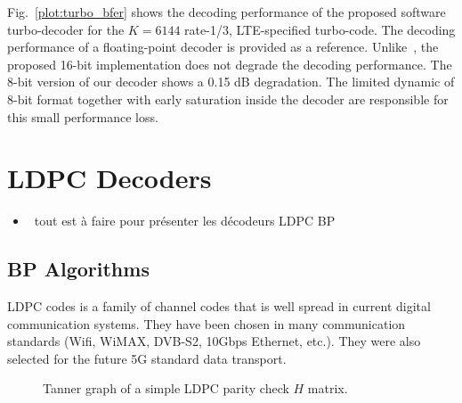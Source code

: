 Fig.~\ref{plot:turbo_bfer} shows the decoding performance of the proposed
software turbo-decoder for the $K = 6144$ rate-1/3, LTE-specified turbo-code.
The decoding performance of a floating-point decoder is provided as a reference.
Unlike~\cite{Wu2013}, the proposed 16-bit implementation does not degrade the
decoding performance. The 8-bit version of our decoder shows a 0.15 dB
degradation. The limited dynamic of 8-bit format together with early saturation
inside the decoder are responsible for this small performance loss.

\section{LDPC Decoders}

\begin{itemize}
  \item \xmark~tout est à faire pour présenter les décodeurs LDPC BP
\end{itemize}

\subsection{BP Algorithms}

LDPC codes is a family of channel codes that is well spread in current digital
communication systems. They have been chosen in many communication standards
(Wifi, WiMAX, DVB-S2, 10Gbps Ethernet, etc.). They were also selected for the
future 5G standard data transport.

\begin{figure}[htp]
  \centering
  
  \caption{Tanner graph of a simple LDPC parity check $H$ matrix.}
  \label{fig:ldpc}
\end{figure}

